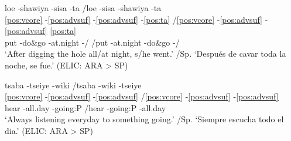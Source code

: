 \documentclass[output=paper,hidelinks]{langscibook}
\begin{document}
\begin{table}
\caption{The adverbial suffix zone}
\label{tab:adverbialsuffixes}
\end{table}

\ea \label{ex:shawiyasisa}
    \glll loe -shawiya -sisa -ta \slash loe -sisa -shawiya -ta \\
    \ref{pos:vcore} -\ref{pos:advsuf} -\ref{pos:advsuf} -\ref{pos:ta} \slash \ref{pos:vcore} -\ref{pos:advsuf} -\ref{pos:advsuf} \ref{pos:ta} \\
     put -do\&go -at.night -\Third\Aarg{}/\Tpl{} \slash put -at.night -do\&go -\Third\Aarg{}/\Tpl{}   \\
    \glt `After digging the hole all/at night, s/he went.' \slash Sp. `Después de cavar toda la noche, se fue.'  \hfill (ELIC: ARA > SP)
\z

\ea \label{ex:tseiyewiki}
    \glll tsaba -tseiye -wiki \slash tsaba -wiki -tseiye \\
    \ref{pos:vcore} -\ref{pos:advsuf} -\ref{pos:advsuf} \slash \ref{pos:vcore} -\ref{pos:advsuf} -\ref{pos:advsuf} \\
     hear -all.day -going:P \slash hear -going:P -all.day  \\
    \glt `Always listening everyday to something going.' \slash Sp. `Siempre escucha todo el dia.'  \hfill (ELIC: ARA > SP)
\z
\end{document}
